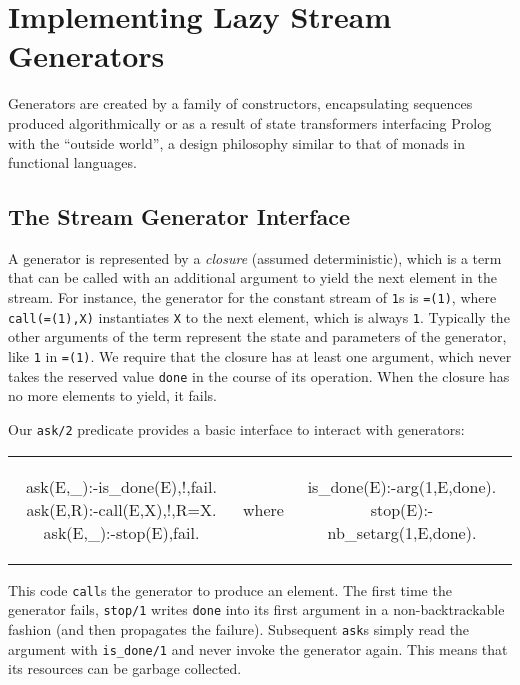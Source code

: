 \documentclass[submission,copyright,creativecommons]{eptcs}
\begin{document}
\section{Implementing Lazy Stream Generators}\label{impl}
  
Generators are created by a family of constructors, encapsulating sequences
produced algorithmically or as a result of state transformers interfacing
Prolog with the ``outside world'', a design philosophy similar to that of
monads in functional languages.

\subsection{The Stream Generator Interface}

A generator is represented by a \emph{closure} (assumed deterministic), which is a term that can be
called with an additional argument to yield the next element in the stream. For
instance, the generator for the constant stream of \texttt{1}s is
\texttt{=(1)}, where \texttt{call(=(1),X)} instantiates \texttt{X} to the next
element, which is always \texttt{1}.  Typically the other arguments of the term
represent the state and parameters of the generator, like \texttt{1} in
\texttt{=(1)}. We require that the closure has at least one argument, which
never takes the reserved value \texttt{done} in the course of its operation.
When the closure has no more elements to yield, it fails.

Our {\tt ask/2} predicate provides a basic interface to interact with generators:\\
\begin{tabular}{ccc}
\begin{minipage}{0.4\textwidth}
\begin{code}
ask(E,_):-is_done(E),!,fail.
ask(E,R):-call(E,X),!,R=X.
ask(E,_):-stop(E),fail.
\end{code}
\end{minipage}
&
where
&
\begin{minipage}{0.4\textwidth}
\begin{code}
is_done(E):-arg(1,E,done).
stop(E):-nb_setarg(1,E,done).
\end{code}
\end{minipage}
\end{tabular}

This code {\tt call}s the generator to produce an element. The first time the
generator fails, \texttt{stop/1} writes \texttt{done} into its first argument
in a non-backtrackable fashion (and then propagates the failure). Subsequent 
{\tt ask}s simply read the argument with \texttt{is\_done/1} and never invoke
the generator again. This means that its resources can be garbage collected.
\end{document}
